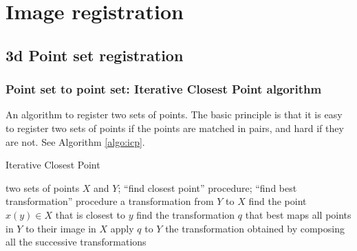 \documentclass[11pt]{article} %
\begin{document}



\newpage

\section{Image registration}
  \subsection{ 3d Point set registration}
    \subsubsection{ Point set to point set: Iterative Closest Point algorithm \linebreak[4] \cite{besl:icp, chen:icp}}
An algorithm to register two sets of points. The basic principle is that it is easy to register two sets of points if the points are matched in pairs, and hard if they are not. See Algorithm \ref{algo:icp}.

\begin{algorithm}[h!]
\caption{Iterative Closest Point}
\label{algo:icp}
\begin{algorithmic}
  \REQUIRE two sets of points $X$ and $Y$; ``find closest point'' procedure; ``find best transformation'' procedure
  \ENSURE a transformation from $Y$ to $X$
  \REPEAT
      \STATE find the point $x(y) \in X$ that is closest to $y$
    \ENDFOR
    \STATE find the transformation $q$ that best maps all points in $Y$ to their image in $X$
    \STATE apply $q$ to $Y$
  \RETURN the transformation obtained by composing all the successive transformations
\end{algorithmic}
\end{algorithm}
\end{document}
